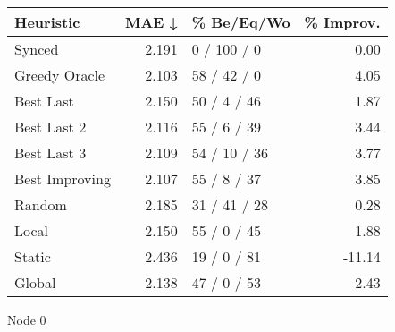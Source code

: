 \begin{tabular}{lrlr}
\toprule
\textbf{Heuristic} & \textbf{MAE ↓} & \textbf{\% Be/Eq/Wo} & \textbf{\% Improv.} \\
\midrule
            Synced &          2.191 &          0 / 100 / 0 &                0.00 \\
     Greedy Oracle &          2.103 &          58 / 42 / 0 &                4.05 \\
         Best Last &          2.150 &          50 / 4 / 46 &                1.87 \\
       Best Last 2 &          2.116 &          55 / 6 / 39 &                3.44 \\
       Best Last 3 &          2.109 &         54 / 10 / 36 &                3.77 \\
    Best Improving &          2.107 &          55 / 8 / 37 &                3.85 \\
            Random &          2.185 &         31 / 41 / 28 &                0.28 \\
             Local &          2.150 &          55 / 0 / 45 &                1.88 \\
            Static &          2.436 &          19 / 0 / 81 &              -11.14 \\
            Global &          2.138 &          47 / 0 / 53 &                2.43 \\
\bottomrule
\end{tabular}
\caption{Node 0}
\label{tab:ds_iid_lr05_le2_bs4_0}
